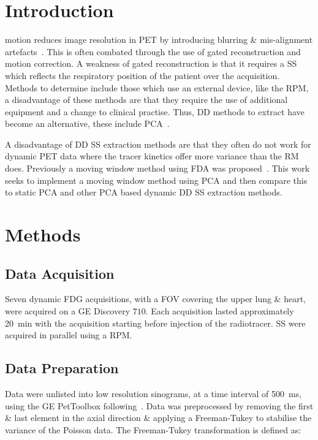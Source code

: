 \section{Introduction} \label{sec:introduction}
     motion reduces image resolution in \gls{PET} by introducing blurring \& mis-alignment artefacts~\cite{Nehmeh2008a}. This is often combated through the use of gated reconstruction and motion correction. A weakness of gated reconstruction is that it requires a \gls{SS} which reflects the respiratory position of the patient over the acquisition. Methods to determine  include those which use an external device, like the \gls{RPM}, a disadvantage of these methods are that they require the use of additional equipment and a change to clinical practise. Thus, \gls{DD} methods to extract  have become an alternative, these include \gls{PCA}~\cite{Thielemans2011}.
    
    A disadvantage of \gls{DD} \gls{SS} extraction methods are that they often do not work for dynamic \gls{PET} data where the tracer kinetics offer more variance than the \gls{RM} does. Previously a moving window method using \gls{FDA} was proposed~\cite{Schleyer2014}. This work seeks to implement a moving window method using \gls{PCA} and then compare this to static \gls{PCA} and other \gls{PCA} based dynamic \gls{DD} \gls{SS} extraction methods.

\section{Methods} \label{sec:methods}
\subsection{Data Acquisition} \label{sec:data_acquisition}
        Seven dynamic \gls{FDG} acquisitions, with a \gls{FOV} covering the upper lung \& heart, were acquired on a \gls{GE} Discovery $710$. Each acquisition lasted approximately \SI{20}{\minute} with the acquisition starting before injection of the radiotracer. \gls{SS} were acquired in parallel using a \gls{RPM}.
        
    \subsection{Data Preparation} \label{sec:data_preparation}
        Data were unlisted into low resolution sinograms, at a time interval of \SI{500}{\milli\second}, using the \gls{GE} PetToolbox following~\cite{Bertolli2018Data-DrivenTomography}. Data was preprocessed by removing the first \& last element in the axial direction \& applying a Freeman-Tukey to stabilise the variance of the Poisson data. The Freeman-Tukey transformation is defined as:
        

